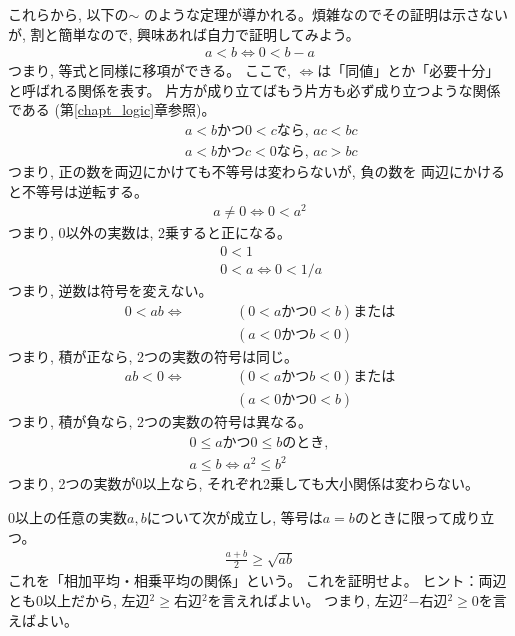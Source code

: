 これらから, 以下の$\sim$
のような定理が導かれる。煩雑なのでその証明は示さないが, 
割と簡単なので, 興味あれば自力で証明してみよう。
\begin{eqnarray}
a<b\Longleftrightarrow0<b-a\label{eq:th_order_1}
\end{eqnarray}
つまり, 等式と同様に移項ができる。
ここで, $\Longleftrightarrow$は「同値」とか「必要十分」と呼ばれる関係を表す。
片方が成り立てばもう片方も必ず成り立つような関係である
(第\ref{chapt_logic}章参照)。
\begin{eqnarray}
&&a<b\text{かつ}0<c\text{なら, }ac<bc\label{eq:th_order_2}\\
&&a<b\text{かつ}c<0\text{なら, }ac>bc\label{eq:th_order_3}
\end{eqnarray}
つまり, 正の数を両辺にかけても不等号は変わらないが, 負の数を
両辺にかけると不等号は逆転する。
\begin{eqnarray}
a\neq0\Longleftrightarrow0<a^2\label{eq:th_order_4}
\end{eqnarray}
つまり, 0以外の実数は, 2乗すると正になる。
\begin{eqnarray}
&&0<1\label{eq:th_order_5}\\
&&0<a\Longleftrightarrow0<1/a\label{eq:th_order_6}
\end{eqnarray}
つまり, 逆数は符号を変えない。
\begin{eqnarray}
0<ab \Longleftrightarrow \quad\quad&& (0<a \text{かつ} 0<b)\text{または}\nonumber\\
              && (a<0 \text{かつ} b<0)\label{eq:th_order_7}
\end{eqnarray}
つまり, 積が正なら, 2つの実数の符号は同じ。
\begin{eqnarray}
ab<0 \Longleftrightarrow \quad\quad&& (0<a \text{かつ} b<0)\text{または}\nonumber\\
              && (a<0 \text{かつ} 0<b)\label{eq:th_order_8}
\end{eqnarray}
つまり, 積が負なら, 2つの実数の符号は異なる。
\begin{eqnarray}
0\leq a\text{かつ}0\leq bのとき, \nonumber\\
a\leq b \Longleftrightarrow a^2\leq b^2\label{eq:th_order_9}
\end{eqnarray}
つまり, 2つの実数が0以上なら, それぞれ2乗しても大小関係は変わらない。

\begin{q}\label{q:alg_ineq4}
 0以上の任意の実数$a, b$について次が成立し, 等号は$a=b$のときに限って成り立つ。
\begin{eqnarray}
\frac{a+b}{2}\geq \sqrt{ab}
\end{eqnarray}
これを「相加平均・相乗平均の関係」という。
これを証明せよ。 {\small ヒント：両辺とも0以上だから, 左辺$^2$$\geq$右辺$^2$を言えればよい。
つまり, 左辺$^2$$-$右辺$^2$$\geq$0を言えばよい。}
\end{q}

